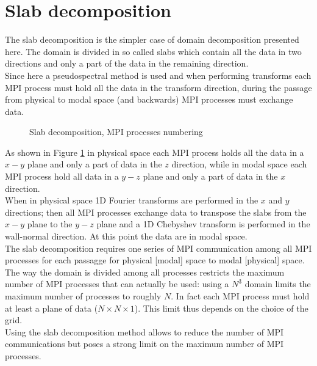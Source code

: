 \section{Slab decomposition}
\label{sec: slab}
The slab decomposition is the simpler case of domain decomposition presented here. The domain is divided in so called slabs which contain all the data in two directions and only a part of the data in the remaining direction.\\
Since here a pseudospectral method is used and when performing transforms each MPI process must hold all the data in the transform direction, during the passage from physical to modal space (and backwards) MPI processes must exchange data. 
\begin{figure}[h!]
\centering
\begin{subfigure}{0.45\textwidth}

\end{subfigure}%
\hspace{0.5cm}
\begin{subfigure}{0.45\textwidth}

\end{subfigure}
\caption{Slab decomposition, MPI processes numbering}
\label{fig: slab}
\end{figure}
As shown in Figure \ref{fig: slab} in physical space each MPI process holds all the data in a $x-y$ plane and only a part of data in the $z$ direction, while in modal space each MPI process hold all data in a $y-z$ plane and only a part of data in the $x$ direction.\\
When in physical space 1D Fourier transforms are performed in the $x$ and $y$ directions; then all MPI processes exchange data to transpose the slabs from the $x-y$ plane to the $y-z$ plane and a 1D Chebyshev transform is performed in the wall-normal direction. At this point the data are in modal space.\\
The slab decomposition requires one series of MPI communication among all MPI processes for each passagge for physical [modal] space to modal [physical] space. The way the domain is divided among all processes restricts the maximum number of MPI processes that can actually be used: using a $N^3$ domain limits the maximum number of processes to roughly $N$. In fact each MPI process must hold at least a plane of data ($N\times N\times 1$). This limit thus depends on the choice of the grid.\\
Using the slab decomposition method allows to reduce the number of MPI communications but poses a strong limit on the maximum number of MPI processes.

